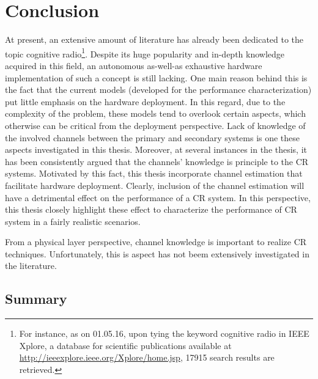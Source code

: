 \chapter{Conclusion}
\label{chap:Con}

At present, an extensive amount of literature has already been dedicated to the topic cognitive radio\footnote{For instance, as on 01.05.16, upon tying the keyword cognitive radio in IEEE Xplore, a database for scientific publications available at \url{http://ieeexplore.ieee.org/Xplore/home.jsp}, 17915 search results are retrieved.}. Despite its huge popularity and in-depth knowledge acquired in this field, an autonomous as-well-as exhaustive hardware implementation of such a concept is still lacking. One main reason behind this is the fact that the current models (developed for the performance characterization) put little emphasis on the hardware deployment. In this regard, due to the complexity of the problem, these models tend to overlook certain aspects, which otherwise can be critical from the deployment perspective. Lack of knowledge of the involved channels between the primary and secondary systems is one these aspects investigated in this thesis. Moreover, at several instances in the thesis, it has been consistently argued that the channels' knowledge is principle to the CR systems. Motivated by this fact, this thesis incorporate channel estimation that facilitate hardware deployment. Clearly, inclusion of the channel estimation will have a detrimental effect on the performance of a CR system. In this perspective, this thesis closely highlight these effect to characterize the performance of CR system in a fairly realistic scenarios. 

From a physical layer perspective, channel knowledge is important to realize CR techniques. Unfortunately, this is aspect has not beem extensively investigated in the literature. 

\section{Summary}


